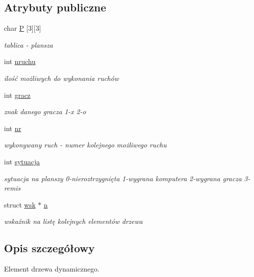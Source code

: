 \subsection*{Atrybuty publiczne}
\begin{DoxyCompactItemize}
\item 
char \hyperlink{structwezel_af8b190ce1c018baaf3d6b29c8b1703ca}{P} \mbox{[}3\mbox{]}\mbox{[}3\mbox{]}
\begin{DoxyCompactList}\small\item\em tablica -\/ plansza \end{DoxyCompactList}\item 
int \hyperlink{structwezel_a810cda81b39057158de9c45373bb6959}{nruchu}
\begin{DoxyCompactList}\small\item\em ilość możliwych do wykonania ruchów \end{DoxyCompactList}\item 
int \hyperlink{structwezel_ae0d7a5ffe5db5ae68d74ab8b796ef9d0}{gracz}
\begin{DoxyCompactList}\small\item\em znak danego gracza 1-\/\textquotesingle{}x\textquotesingle{} 2-\/\textquotesingle{}o\textquotesingle{} \end{DoxyCompactList}\item 
int \hyperlink{structwezel_aa2eeaaa4d77865a3a4d0e0fd4fbde30b}{nr}
\begin{DoxyCompactList}\small\item\em wykonywany ruch -\/ numer kolejnego możliwego ruchu \end{DoxyCompactList}\item 
int \hyperlink{structwezel_a87379e5872e2a13715421baec8dae5cf}{sytuacja}
\begin{DoxyCompactList}\small\item\em sytuacja na planszy 0-\/nieroztrzygnięta 1-\/wygrana komputera 2-\/wygrana gracza 3-\/remis \end{DoxyCompactList}\item 
struct \hyperlink{structwsk}{wsk} $\ast$ \hyperlink{structwezel_afa4e8d9b533246f9cf7d3ccdeefa2b3e}{n}
\begin{DoxyCompactList}\small\item\em wskaźnik na listę kolejnych elementów drzewa \end{DoxyCompactList}\end{DoxyCompactItemize}


\subsection{Opis szczegółowy}
Element drzewa dynamicznego. 

